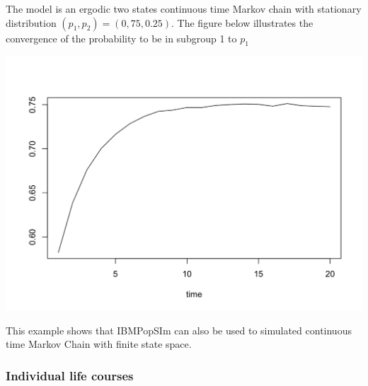 The model is an ergodic two states continuous time Markov chain with stationary distribution \((p_1,p_2)=(0,75,0.25)\). The figure below illustrates the convergence of the probability to be in subgroup 1 to \(p_1\)

\begin{Shaded}
\begin{Highlighting}[]
\StringTok{ }
\StringTok{ }\OperatorTok{$}
                      \NormalTok{(}\NormalTok{(}\OperatorTok{==}\NormalTok{))}\OperatorTok{/}
\NormalTok{                \})}
\end{Highlighting}
\end{Shaded}

\begin{center}\includegraphics{figure/main_prob_subgroup1-1} \end{center}

This example shows that IBMPopSIm can also be used to simulated continuous time Markov Chain with finite state space.

\hypertarget{individual-life-courses}{%
\subsubsection{Individual life courses}\label{individual-life-courses}}

